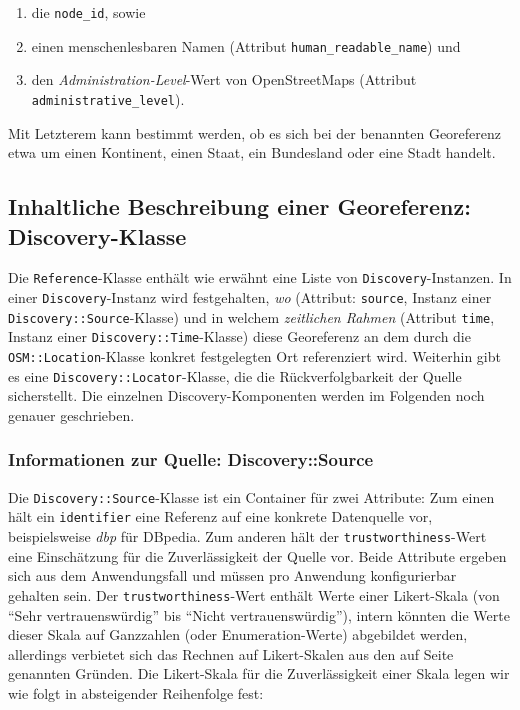 \begin{enumerate}
  \item die \texttt{node\_id}, sowie 
  \item einen menschenlesbaren Namen (Attribut \texttt{human\_readable\_name}) und 
  \item den \textit{Administration-Level}-Wert von OpenStreetMaps\cite{OSMadminlevel} (Attribut \texttt{administrative\_level}). 
\end{enumerate}

Mit Letzterem kann bestimmt werden, ob es sich bei der benannten Georeferenz etwa um einen Kontinent, einen Staat, ein Bundesland oder eine Stadt handelt.

\subsection{Inhaltliche Beschreibung einer Georeferenz: Discovery-Klasse}
Die \texttt{Reference}-Klasse enthält wie erwähnt eine Liste von \texttt{Discovery}-Instanzen. In einer \texttt{Discovery}-Instanz wird festgehalten, \textit{wo} (Attribut: \texttt{source}, Instanz einer \texttt{Discovery::Source}-Klasse) und in welchem \textit{zeitlichen Rahmen} (Attribut \texttt{time}, Instanz einer \texttt{Discovery::Time}-Klasse) diese Georeferenz an dem durch die \texttt{OSM::Location}-Klasse konkret festgelegten Ort referenziert wird. Weiterhin gibt es eine \texttt{Discovery::Locator}-Klasse, die die Rückverfolgbarkeit der Quelle sicherstellt. Die einzelnen Discovery-Komponenten werden im Folgenden noch genauer geschrieben.

\subsubsection{Informationen zur Quelle: Discovery::Source}
Die \texttt{Discovery::Source}-Klasse ist ein Container für zwei Attribute: Zum einen hält ein \texttt{identifier} eine Referenz auf eine konkrete Datenquelle vor, beispielsweise \textit{dbp} für DBpedia. Zum anderen hält der \texttt{trustworthiness}-Wert eine Einschätzung für die Zuverlässigkeit der Quelle vor. Beide Attribute ergeben sich aus dem Anwendungsfall und müssen pro Anwendung konfigurierbar gehalten sein. Der \texttt{trustworthiness}-Wert enthält Werte einer Likert-Skala (von ``Sehr vertrauenswürdig'' bis ``Nicht vertrauenswürdig''), intern könnten die Werte dieser Skala auf Ganzzahlen (oder Enumeration-Werte) abgebildet werden, allerdings verbietet sich das Rechnen auf Likert-Skalen aus den auf Seite \pageref{calc_likert} genannten Gründen. Die Likert-Skala für die Zuverlässigkeit einer Skala legen wir wie folgt in absteigender Reihenfolge fest:

